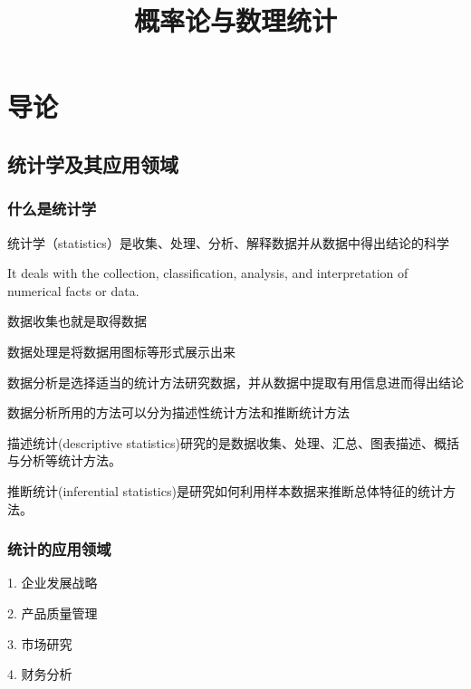 \documentclass[UTF8,10pt]{book}
\begin{document}
    \title{概率论与数理统计}

    \maketitle
    \tableofcontents
    
\clearpage

\chapter{导论}


    \section{统计学及其应用领域}
    \subsection{什么是统计学}
    统计学（statistics）是收集、处理、分析、解释数据并从数据中得出结论的科学
    
    It deals with the collection, classification, analysis, and interpretation of numerical facts or data.

    数据收集也就是取得数据

    数据处理是将数据用图标等形式展示出来

    数据分析是选择适当的统计方法研究数据，并从数据中提取有用信息进而得出结论

    数据分析所用的方法可以分为描述性统计方法和推断统计方法

    描述统计(descriptive statistics)研究的是数据收集、处理、汇总、图表描述、概括与分析等统计方法。

    推断统计(inferential statistics)是研究如何利用样本数据来推断总体特征的统计方法。
    \subsection{统计的应用领域}
    1. 企业发展战略

    2. 产品质量管理

    3. 市场研究

    4. 财务分析
\end{document}
